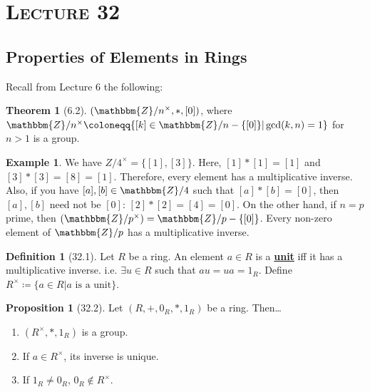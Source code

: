 \documentclass{article}
\newcommand{\Z}{\mathbbm{Z}}
\newcommand{\coleq}{\coloneqq}
\newcommand{\define}[1]{\textbf{\underline{#1}}}
\theoremstyle{definition}
\newtheorem*{defn}{Definition}
\newtheorem*{thm}{Theorem}
\newtheorem*{prop}{Proposition}
\newtheorem*{ex}{Example}
\theoremstyle{remark}
\begin{document}
    \section*{\textbf{\textsc{Lecture 32}}}{
        \subsection*{Properties of Elements in Rings}{
            Recall from Lecture 6 the following:
            \begin{thm}[6.2]
                $(\Z/n^\times,*,[0])$, where $\Z/n^\times \coleq \{[k] \in \Z/n-\{[0]\}|\gcd(k,n)=1\}$ for $n>1$ is a group.
            \end{thm}
            
            \begin{ex}
                We have $Z/4^\times=\{[1],[3]\}$. Here, $[1]*[1]=[1]$ and $[3]*[3]=[8]=[1]$. Therefore, every element has a multiplicative inverse. Also, if you have $[a],[b] \in \Z/4$ such that $[a]*[b]=[0]$, then $[a],[b]$ need not be $[0]$: $[2]*[2]=[4]=[0]$. On the other hand, if $n=p$ prime, then $(\Z/p^\times)=\Z/p-\{[0]\}$. Every non-zero element of $\Z/p$ has a multiplicative inverse.
            \end{ex}
            
            \begin{defn}[32.1]
                Let $R$ be a ring. An element $a \in R$ is a \define{unit} iff it has a multiplicative inverse. i.e. $\exists u \in R$ such that $au=ua=1_R$. Define $R^\times \coleq \{a \in R|a\text{ is a unit}\}$.
            \end{defn}
            
            \begin{prop}[32.2]
                Let $(R,+,0_R,*,1_R)$ be a ring. Then\ldots
                \begin{enumerate}
                    \item $(R^\times,*,1_R)$ is a group.
                    \item If $a \in R^\times$, its inverse is unique.
                    \item If $1_R \neq 0_R$, $0_R \notin R^\times$.
                \end{enumerate}
            \end{prop}
            
}}
\end{document}
